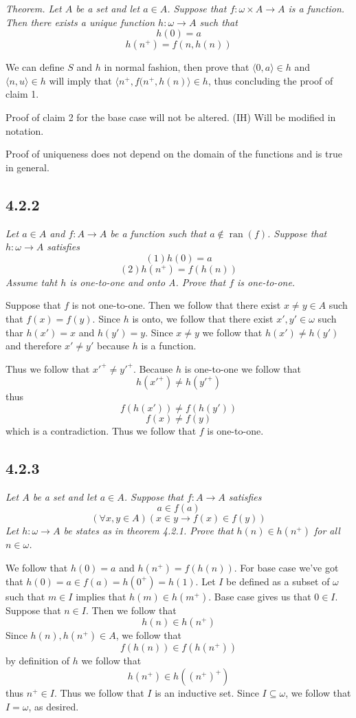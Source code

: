 \documentclass[11pt,oneside,titlepage]{book}
\DeclareMathOperator \ran {ran}
\newcommand{\eangle}[1]{\langle #1 \rangle}
\begin{document}
\textit{Theorem. Let $A$ be a set and let $a \in A$. Suppose that $f: \omega \times A \to A$
  is a function. Then there exists a unique function $h: \omega \to A$ such that
  $$h(0) = a$$
  $$h(n^+) = f(n, h(n))$$}

We can define $S$ and $h$ in normal fashion, then prove that $\eangle{0, a} \in h$ and
$\eangle{n, u} \in h$ will imply that $\eangle{n^+, f(n^+, h(n)} \in h$, thus concluding the
proof of claim 1.

Proof of claim 2 for the base case will not be altered. (IH) Will be modified in notation.


Proof of uniqueness does not depend on the domain of the functions and is true in general.

\subsection*{4.2.2}

\textit{Let $a \in A$ and $f: A \to A$ be a function such that $a \notin \ran(f)$. Suppose that
  $h: \omega \to A$ satisfies
  $$(1) h(0) = a$$
  $$(2) h(n^+) = f(h(n))$$
  Assume taht $h$ is one-to-one and onto A. Prove that $f$ is one-to-one.
}

Suppose that $f$ is not one-to-one. Then we follow that there exist $x \neq y \in A$
such that $f(x) = f(y)$. Since $h$ is onto, we follow that there exist $x', y' \in \omega$
such thar $h(x') = x$ and $h(y') = y$. Since $x \neq y$ we follow that $h(x') \neq h(y')$
and therefore $x' \neq y'$ because $h$ is a function.

Thus we follow that $x'^+ \neq y'^+$. Because $h$ is one-to-one we follow that
$$h(x'^+) \neq  h(y'^+)$$
thus
$$f(h(x')) \neq  f(h(y'))$$
$$f(x) \neq  f(y)$$
which is a contradiction. Thus we follow that $f$ is one-to-one.

\subsection*{4.2.3}

\textit{Let $A$ be a set and let $a \in A$. Suppose that $f: A \to A$ satisfies 
$$a \in f(a)$$
$$(\forall x, y \in A)(x \in y \to f(x) \in f(y))$$
Let $h: \omega \to A$ be states as in theorem 4.2.1. Prove that $h(n) \in h(n^+)$ for
all $n \in \omega$.}

We follow that $h(0) = a$ and $h(n^+) = f(h(n))$. For base case we've got that
$h(0) = a \in f(a) = h(0^+) = h(1)$.
Let $I$ be defined as a subset of $\omega$  such that $m \in I$ implies
that $h(m) \in h(m^+)$. Base case gives us that $0 \in I$. Suppose that
$n \in I$. Then we follow that
$$h(n) \in h(n^+)$$
Since $h(n), h(n^+) \in A$, we follow that
$$f(h(n)) \in f(h(n^+))$$
by definition of $h$ we follow that
$$h(n^+) \in h((n^+)^+)$$
thus $n^+ \in I$. Thus we follow that $I$ is an inductive set. Since $I \subseteq \omega$,
we follow that $I = \omega$, as desired.
\end{document}
